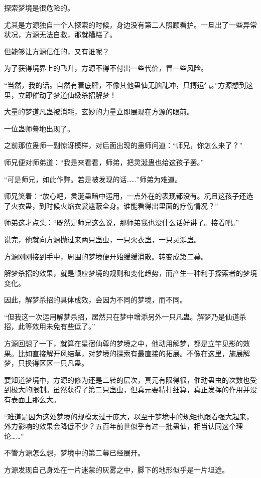 \begin{this_body}
探索梦境是很危险的。

尤其是方源独自一个人探索的时候，身边没有第二人照顾看护。一旦出了一些异常状况，方源无法自救，那就糟糕了。

但能够让方源信任的，又有谁呢？

为了获得境界上的飞升，方源不得不付出一些代价，冒一些风险。

“当然，我的话。自然有着底牌，不像其他蛊仙无脑乱冲，只搏运气。”方源想到这里，立即催动了梦道仙级杀招解梦！

大量的梦道凡蛊被消耗，玄妙的力量立即展现在方源的眼前。

一位蛊师蓦地出现了。

之前那位蛊师一副惊讶模样，对后面出现的蛊师问道：“师兄，你怎么来了？”

师兄便对师弟道：“我是来看看，师弟，把灵涎蛊也给这孩子罢。”

“可是师兄，如此作弊。若是被发现的话……”师弟为难道。

师兄笑着：“放心吧，灵涎蛊暗中运用，一点外在的表现都没有。况且这孩子还选了火衣蛊，到时候火焰衣裳遮蔽全身。谁能看得出里面的疗伤情况？”

师弟这才点头：“既然是师兄这么说，那师弟我也没什么话好讲了。接着吧。”

说完，他就向方源抛过来两只蛊虫，一只火衣蛊，一只灵涎蛊。

方源刚刚接到手中，周围的梦境便开始缓缓消散。转变成第二幕。

解梦杀招的效果，就是顺应梦境的规则和变化趋势，而产生一种利于探索者的梦境变化。

因此，解梦杀招的具体成效，会因为不同的梦境，而不同。

“但我这一次运用解梦杀招，居然只在梦中增添另外一只凡蛊。解梦乃是仙道杀招，此等效用未免有些低了。”

方源回想了一下，就算在星宿仙尊的梦境之中，他动用解梦，都是立竿见影的效果。比如直接解开风结草，对梦境的探索有最直接的拓展。不像在这里，施展解梦，只换得区区一只凡蛊。

要知道梦境中，方源的修为还是二转的层次，真元有限得很，催动蛊虫的次数也受到极大的限制。虽然获得了第二只蛊虫，但真元要精打细算，真正发挥的作用并没有表面上那么大。

“难道是因为这处梦境的规模太过于庞大，以至于梦境中的规矩也跟着强大起来，外力影响的效果会降低不少？五百年前世似乎有过一批蛊仙，相当认同这个理论……”

不管方源怎么想，梦境中的第二幕已经展开。

方源发现自己身处在一片迷蒙的灰雾之中，脚下的地形似乎是一片坦途。


\end{this_body}
